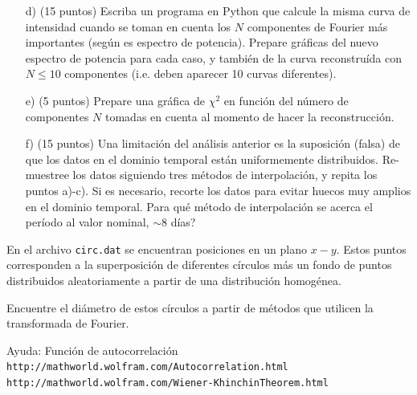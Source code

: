 \documentclass[11pt,letterpaper]{exam}
\begin{document}
\begin{questions}
\begin{itemize}
\item[d)] (15 puntos) Escriba un programa en Python que calcule la misma curva de intensidad cuando se toman en cuenta los $N$ componentes de Fourier m\'as importantes (seg\'un es espectro de potencia). Prepare gr\'aficas del nuevo espectro de potencia para cada caso, y tambi\'en de la curva reconstru\'ida con $N\leq 10$ componentes (i.e. deben aparecer 10 curvas diferentes).  

\item[e)] (5 puntos)
Prepare una gr\'afica de $\chi^2$ en funci\'on del n\'umero de
componentes $N$ tomadas en cuenta al momento de hacer la
reconstrucci\'on.   

\item[f)] (15 puntos) Una limitaci\'on del an\'alisis anterior es la suposici\'on (falsa) de que los datos en el dominio temporal est\'an uniformemente distribuidos. Re-muestree los datos siguiendo tres m\'etodos de interpolaci\'on, y repita los puntos a)-c). Si es necesario, recorte los datos para evitar huecos muy amplios en el dominio temporal. Para qu\'e m\'etodo de interpolaci\'on se acerca el per\'iodo al valor nominal, $\sim$8 d\'ias?


\end{itemize}



En el archivo \verb"circ.dat" se encuentran posiciones en un plano
$x-y$. Estos puntos corresponden a la superposici\'on de diferentes
c\'irculos m\'as un fondo de puntos distribuidos aleatoriamente a
partir de una distribuci\'on homog\'enea. 

Encuentre el di\'ametro de estos c\'irculos a partir de m\'etodos que
utilicen la transformada de Fourier. 

Ayuda:
Funci\'on de autocorrelaci\'on \\ 
\verb"http://mathworld.wolfram.com/Autocorrelation.html"\\
\verb"http://mathworld.wolfram.com/Wiener-KhinchinTheorem.html"

\end{questions}
\end{document}
